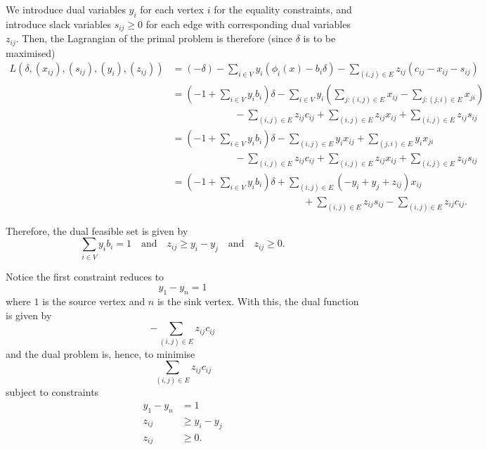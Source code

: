 \documentclass[11pt]{article}
\theoremstyle{definition}
\theoremstyle{remark}
\newcommand{\pqty}[1]{\left(#1\right)}
\newcommand{\qand}{\quad\text{and}\quad}
\begin{document}
We introduce dual variables \(y_i\) for each vertex \(i\) for the equality constraints, and introduce slack variables \(s_{ij} \geq 0\) for each edge with corresponding dual variables \(z_{ij}\). Then, the Lagrangian of the primal problem is therefore (since \(\delta\) is to be maximised)
\begin{align*}
    L\pqty{\delta, \pqty{x_{ij}}, \pqty{s_{ij}}, \pqty{y_i}, \pqty{z_{ij}}} &= \pqty{-\delta} - \sum_{i \in V} y_i \pqty{\phi_i \pqty{x} - b_i \delta} - \sum_{\pqty{i, j} \in E} z_{ij} \pqty{c_{ij} - x_{ij} - s_{ij}} \\
    &= \pqty{-1 + \sum_{i \in V} y_i b_i} \delta - \sum_{i \in V} y_i \pqty{\sum_{j: \pqty{i, j} \in E} x_{ij} - \sum_{j: \pqty{j, i} \in E} x_{ji}} \\
    &\phantom{=} \hspace{5em} - \sum_{\pqty{i, j} \in E} z_{ij} c_{ij} + \sum_{\pqty{i, j} \in E} z_{ij} x_{ij} + \sum_{\pqty{i, j} \in E} z_{ij} s_{ij} \\
    &= \pqty{-1 + \sum_{i \in V} y_i b_i} \delta - \sum_{\pqty{i, j} \in E} y_i x_{ij} + \sum_{\pqty{j, i} \in E} y_i x_{ji} \\
    &\phantom{=} \hspace{5em} - \sum_{\pqty{i, j} \in E} z_{ij} c_{ij} + \sum_{\pqty{i, j} \in E} z_{ij} x_{ij} + \sum_{\pqty{i, j} \in E} z_{ij} s_{ij} \\
    &=  \pqty{-1 + \sum_{i \in V} y_i b_i} \delta + \sum_{\pqty{i, j} \in E} \pqty{- y_i + y_j + z_{ij}} x_{ij} \\
    &\phantom{=} \hspace{12em} + \sum_{\pqty{i, j} \in E} z_{ij} s_{ij} - \sum_{\pqty{i, j} \in E} z_{ij} c_{ij}.
\end{align*}

Therefore, the dual feasible set is given by
\[
    \sum_{i \in V} y_i b_i = 1 \qand z_{ij} \geq y_i - y_j \qand z_{ij} \geq 0.
\]

Notice the first constraint reduces to
\[
    y_1 - y_n = 1
\]
where \(1\) is the source vertex and \(n\) is the sink vertex. With this, the dual function is given by
\[
    -\sum_{\pqty{i, j} \in E} z_{ij} c_{ij}
\]
and the dual problem is, hence, to minimise
\[
    \sum_{\pqty{i, j} \in E} z_{ij} c_{ij}
\]
subject to constraints
\begin{align*}
    y_1 - y_n &= 1 \\
    z_{ij} &\geq y_i - y_j \\
    z_{ij} &\geq 0.
\end{align*}
\end{document}
